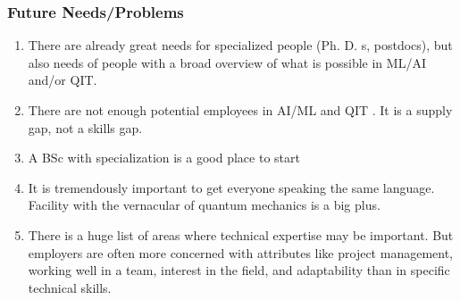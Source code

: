 \documentclass{beamer}
\begin{document}
\begin{frame}
\frametitle{Future Needs/Problems}

\begin{enumerate}
\item There are already  great needs for specialized people (Ph. D. s, postdocs), but also needs of  people with a broad overview of what is possible in ML/AI and/or QIT.

\item There are not enough potential employees in AI/ML and QIT . It is a supply gap, not a skills gap.

\item A BSc with specialization  is a good place to start

\item It is tremendously important to get everyone speaking the same language. Facility with the vernacular of quantum mechanics is a big plus.

\item There is a huge list of areas where technical expertise may be important. But employers are often more concerned with attributes like project management, working well in a team, interest in the field, and adaptability than in specific technical skills.
\end{enumerate}

\noindent
\end{frame}
\end{document}
